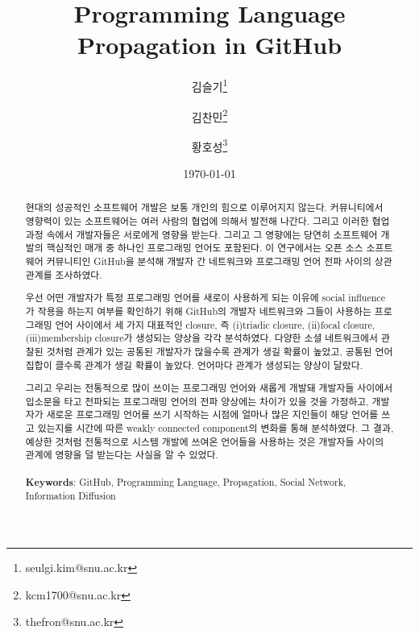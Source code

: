 \documentclass[10pt, a4paper, titlepage]{article}
\title{
	Programming Language Propagation in GitHub
}
\author[ ]{김슬기\thanks{seulgi.kim@snu.ac.kr}}
\author[ ]{김찬민\thanks{kcm1700@snu.ac.kr}}
\author[ ]{황호성\thanks{thefron@snu.ac.kr}}
\affil[ ]{서울대학교 컴퓨터공학부}
\date{\today}
\begin{document}
\maketitle


\begin{abstract}
현대의 성공적인 소프트웨어 개발은 보통 개인의 힘으로 이루어지지 않는다. 커뮤니티에서 영향력이 있는 소프트웨어는 여러 사람의 협업에 의해서 발전해 나간다. 그리고 이러한 협업 과정 속에서 개발자들은 서로에게 영향을 받는다. 그리고 그 영향에는 당연히 소프트웨어 개발의 핵심적인 매개 중 하나인 프로그래밍 언어도 포함된다. 이 연구에서는 오픈 소스 소프트웨어 커뮤니티인 GitHub을 분석해 개발자 간 네트워크와 프로그래밍 언어 전파 사이의 상관 관계를  조사하였다.

우선 어떤 개발자가 특정 프로그래밍 언어를 새로이 사용하게 되는 이유에 social influence가 작용을 하는지 여부를 확인하기 위해 GitHub의 개발자 네트워크와 그들이 사용하는 프로그래밍 언어 사이에서 세 가지 대표적인 closure, 즉 (i)triadic closure, (ii)focal closure, (iii)membership closure가 생성되는 양상을 각각 분석하였다. 다양한 소셜 네트워크에서 관찰된 것처럼 관계가 있는 공통된 개발자가 많을수록 관계가 생길 확률이 높았고, 공통된 언어 집합이 클수록 관계가 생길 확률이 높았다. 언어마다 관계가 생성되는 양상이 달랐다.


그리고 우리는 전통적으로 많이 쓰이는 프로그래밍 언어와 새롭게 개발돼 개발자들 사이에서 입소문을 타고 전파되는 프로그래밍 언어의 전파 양상에는 차이가 있을 것을 가정하고, 개발자가 새로운 프로그래밍 언어를 쓰기 시작하는 시점에 얼마나 많은 지인들이 해당 언어를 쓰고 있는지를 시간에 따른 weakly connected component의 변화를 통해 분석하였다. 그 결과, 예상한 것처럼 전통적으로 시스템 개발에 쓰여온 언어들을 사용하는 것은 개발자들 사이의 관계에 영향을 덜 받는다는 사실을 알 수 있었다.
\\ \\
{\bf Keywords}: GitHub, Programming Language, Propagation, Social Network, Information Diffusion
\end{abstract}

\tableofcontents %
\end{document}
